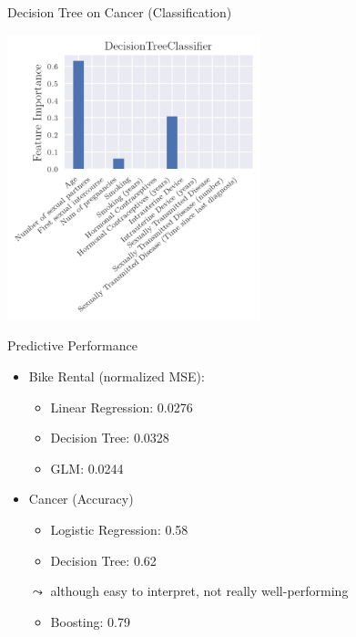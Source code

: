 \documentclass[11pt,compress,t,notes=noshow, xcolor=table]{beamer}
\begin{document}
	\begin{vbframe}{Decision Tree on  Cancer (Classification)}
        
        \centering
        \includegraphics[width=0.55\textwidth]{figure/dt_cancer.png}     
    \end{vbframe}
	
	\begin{vbframe}{Predictive Performance}
        
        \begin{itemize}
            \item Bike Rental (normalized MSE):
            \begin{itemize}
                \item Linear Regression: 0.0276
                \item Decision Tree: 0.0328
                \item GLM: 0.0244
            \end{itemize}
            
            \medskip
            \item Cancer (Accuracy)
            \begin{itemize}
                \item Logistic Regression: 0.58
                \item Decision Tree: 0.62
            \end{itemize}
            
            \smallskip
            \item[$\leadsto$] although easy to interpret, not really well-performing 
            \begin{itemize}
                \item Boosting: 0.79
            \end{itemize}
        \end{itemize}
        
    \end{vbframe}
	

\endlecture
\end{document}
